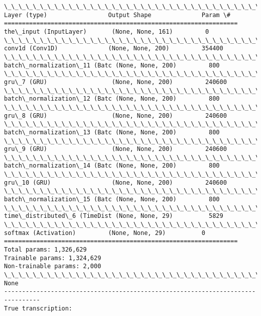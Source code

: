 \documentclass[11pt]{article}
\begin{document}
    \begin{Verbatim}[commandchars=\\\{\}]
\_\_\_\_\_\_\_\_\_\_\_\_\_\_\_\_\_\_\_\_\_\_\_\_\_\_\_\_\_\_\_\_\_\_\_\_\_\_\_\_\_\_\_\_\_\_\_\_\_\_\_\_\_\_\_\_\_\_\_\_\_\_\_\_\_
Layer (type)                 Output Shape              Param \#   
=================================================================
the\_input (InputLayer)       (None, None, 161)         0         
\_\_\_\_\_\_\_\_\_\_\_\_\_\_\_\_\_\_\_\_\_\_\_\_\_\_\_\_\_\_\_\_\_\_\_\_\_\_\_\_\_\_\_\_\_\_\_\_\_\_\_\_\_\_\_\_\_\_\_\_\_\_\_\_\_
conv1d (Conv1D)              (None, None, 200)         354400    
\_\_\_\_\_\_\_\_\_\_\_\_\_\_\_\_\_\_\_\_\_\_\_\_\_\_\_\_\_\_\_\_\_\_\_\_\_\_\_\_\_\_\_\_\_\_\_\_\_\_\_\_\_\_\_\_\_\_\_\_\_\_\_\_\_
batch\_normalization\_11 (Batc (None, None, 200)         800       
\_\_\_\_\_\_\_\_\_\_\_\_\_\_\_\_\_\_\_\_\_\_\_\_\_\_\_\_\_\_\_\_\_\_\_\_\_\_\_\_\_\_\_\_\_\_\_\_\_\_\_\_\_\_\_\_\_\_\_\_\_\_\_\_\_
gru\_7 (GRU)                  (None, None, 200)         240600    
\_\_\_\_\_\_\_\_\_\_\_\_\_\_\_\_\_\_\_\_\_\_\_\_\_\_\_\_\_\_\_\_\_\_\_\_\_\_\_\_\_\_\_\_\_\_\_\_\_\_\_\_\_\_\_\_\_\_\_\_\_\_\_\_\_
batch\_normalization\_12 (Batc (None, None, 200)         800       
\_\_\_\_\_\_\_\_\_\_\_\_\_\_\_\_\_\_\_\_\_\_\_\_\_\_\_\_\_\_\_\_\_\_\_\_\_\_\_\_\_\_\_\_\_\_\_\_\_\_\_\_\_\_\_\_\_\_\_\_\_\_\_\_\_
gru\_8 (GRU)                  (None, None, 200)         240600    
\_\_\_\_\_\_\_\_\_\_\_\_\_\_\_\_\_\_\_\_\_\_\_\_\_\_\_\_\_\_\_\_\_\_\_\_\_\_\_\_\_\_\_\_\_\_\_\_\_\_\_\_\_\_\_\_\_\_\_\_\_\_\_\_\_
batch\_normalization\_13 (Batc (None, None, 200)         800       
\_\_\_\_\_\_\_\_\_\_\_\_\_\_\_\_\_\_\_\_\_\_\_\_\_\_\_\_\_\_\_\_\_\_\_\_\_\_\_\_\_\_\_\_\_\_\_\_\_\_\_\_\_\_\_\_\_\_\_\_\_\_\_\_\_
gru\_9 (GRU)                  (None, None, 200)         240600    
\_\_\_\_\_\_\_\_\_\_\_\_\_\_\_\_\_\_\_\_\_\_\_\_\_\_\_\_\_\_\_\_\_\_\_\_\_\_\_\_\_\_\_\_\_\_\_\_\_\_\_\_\_\_\_\_\_\_\_\_\_\_\_\_\_
batch\_normalization\_14 (Batc (None, None, 200)         800       
\_\_\_\_\_\_\_\_\_\_\_\_\_\_\_\_\_\_\_\_\_\_\_\_\_\_\_\_\_\_\_\_\_\_\_\_\_\_\_\_\_\_\_\_\_\_\_\_\_\_\_\_\_\_\_\_\_\_\_\_\_\_\_\_\_
gru\_10 (GRU)                 (None, None, 200)         240600    
\_\_\_\_\_\_\_\_\_\_\_\_\_\_\_\_\_\_\_\_\_\_\_\_\_\_\_\_\_\_\_\_\_\_\_\_\_\_\_\_\_\_\_\_\_\_\_\_\_\_\_\_\_\_\_\_\_\_\_\_\_\_\_\_\_
batch\_normalization\_15 (Batc (None, None, 200)         800       
\_\_\_\_\_\_\_\_\_\_\_\_\_\_\_\_\_\_\_\_\_\_\_\_\_\_\_\_\_\_\_\_\_\_\_\_\_\_\_\_\_\_\_\_\_\_\_\_\_\_\_\_\_\_\_\_\_\_\_\_\_\_\_\_\_
time\_distributed\_6 (TimeDist (None, None, 29)          5829      
\_\_\_\_\_\_\_\_\_\_\_\_\_\_\_\_\_\_\_\_\_\_\_\_\_\_\_\_\_\_\_\_\_\_\_\_\_\_\_\_\_\_\_\_\_\_\_\_\_\_\_\_\_\_\_\_\_\_\_\_\_\_\_\_\_
softmax (Activation)         (None, None, 29)          0         
=================================================================
Total params: 1,326,629
Trainable params: 1,324,629
Non-trainable params: 2,000
\_\_\_\_\_\_\_\_\_\_\_\_\_\_\_\_\_\_\_\_\_\_\_\_\_\_\_\_\_\_\_\_\_\_\_\_\_\_\_\_\_\_\_\_\_\_\_\_\_\_\_\_\_\_\_\_\_\_\_\_\_\_\_\_\_
None
--------------------------------------------------------------------------------
True transcription:


\end{Verbatim}
\end{document}
